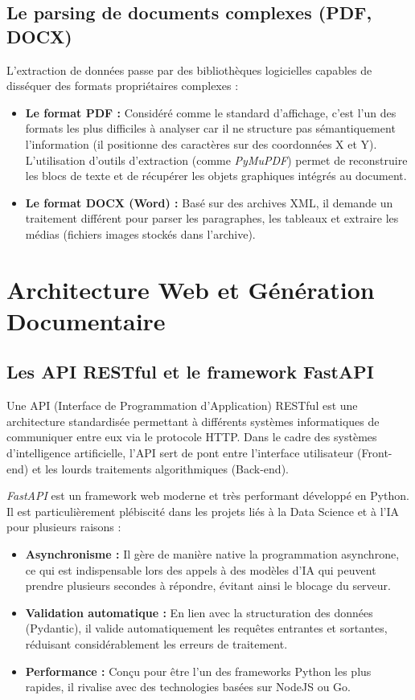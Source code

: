 \subsection{Le parsing de documents complexes (PDF, DOCX)}
L'extraction de données passe par des bibliothèques logicielles capables de disséquer des formats propriétaires complexes :
\begin{itemize}
    \item \textbf{Le format PDF :} Considéré comme le standard d'affichage, c'est l'un des formats les plus difficiles à analyser car il ne structure pas sémantiquement l'information (il positionne des caractères sur des coordonnées X et Y). L'utilisation d'outils d'extraction (comme \textit{PyMuPDF}) permet de reconstruire les blocs de texte et de récupérer les objets graphiques intégrés au document.
    \item \textbf{Le format DOCX (Word) :} Basé sur des archives XML, il demande un traitement différent pour parser les paragraphes, les tableaux et extraire les médias (fichiers images stockés dans l'archive).
\end{itemize}


\section{Architecture Web et Génération Documentaire}

\subsection{Les API RESTful et le framework FastAPI}
Une API (Interface de Programmation d'Application) RESTful est une architecture standardisée permettant à différents systèmes informatiques de communiquer entre eux via le protocole HTTP. Dans le cadre des systèmes d'intelligence artificielle, l'API sert de pont entre l'interface utilisateur (Front-end) et les lourds traitements algorithmiques (Back-end).

\textit{FastAPI} est un framework web moderne et très performant développé en Python. Il est particulièrement plébiscité dans les projets liés à la Data Science et à l'IA pour plusieurs raisons :
\begin{itemize}
    \item \textbf{Asynchronisme :} Il gère de manière native la programmation asynchrone, ce qui est indispensable lors des appels à des modèles d'IA qui peuvent prendre plusieurs secondes à répondre, évitant ainsi le blocage du serveur.
    \item \textbf{Validation automatique :} En lien avec la structuration des données (Pydantic), il valide automatiquement les requêtes entrantes et sortantes, réduisant considérablement les erreurs de traitement.
    \item \textbf{Performance :} Conçu pour être l'un des frameworks Python les plus rapides, il rivalise avec des technologies basées sur NodeJS ou Go.
\end{itemize}

